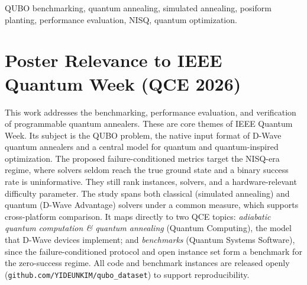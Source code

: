 \documentclass[10pt, conference]{IEEEtran}
\begin{document}
\begin{IEEEkeywords}
QUBO benchmarking, quantum annealing, simulated annealing, posiform planting,
performance evaluation, NISQ, quantum optimization.
\end{IEEEkeywords}

\section*{Poster Relevance to IEEE Quantum Week (QCE 2026)}
This work addresses the benchmarking, performance evaluation, and verification
of programmable quantum annealers. These are core themes of IEEE Quantum Week.
Its subject is the QUBO problem, the native input format of D-Wave quantum
annealers and a central model for quantum and quantum-inspired optimization. The
proposed failure-conditioned metrics target the NISQ-era regime, where solvers
seldom reach the true ground state and a binary success rate is uninformative.
They still rank instances, solvers, and a hardware-relevant difficulty
parameter. The study spans both classical (simulated annealing) and quantum
(D-Wave Advantage) solvers under a common measure, which supports cross-platform
comparison. It maps directly to two QCE topics: \emph{adiabatic quantum computation \&
quantum annealing} (Quantum Computing), the model that D-Wave devices implement;
and \emph{benchmarks} (Quantum Systems Software), since the failure-conditioned
protocol and open instance set form a benchmark for the zero-success regime. All
code and benchmark instances are released openly
(\texttt{github.com/YIDEUNKIM/qubo\_dataset}) to support reproducibility.
\end{document}
